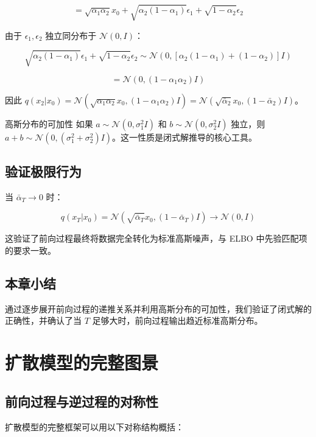 \documentclass[a4paper]{article}
\begin{document}
$$= \sqrt{\alpha_1 \alpha_2} x_0 + \sqrt{\alpha_2(1-\alpha_1)} \epsilon_1 + \sqrt{1-\alpha_2} \epsilon_2$$

由于 $\epsilon_1, \epsilon_2$ 独立同分布于 $\mathcal{N}(0, I)$：

$$\sqrt{\alpha_2(1-\alpha_1)} \epsilon_1 + \sqrt{1-\alpha_2} \epsilon_2 \sim \mathcal{N}(0, [\alpha_2(1-\alpha_1) + (1-\alpha_2)] I)$$

$$= \mathcal{N}(0, (1 - \alpha_1 \alpha_2) I)$$

因此 $q(x_2 | x_0) = \mathcal{N}(\sqrt{\alpha_1 \alpha_2} x_0, (1 - \alpha_1 \alpha_2) I) = \mathcal{N}(\sqrt{\bar{\alpha}_2} x_0, (1-\bar{\alpha}_2) I)$。

\begin{knowledgebox}{高斯分布的可加性}
如果 $a \sim \mathcal{N}(0, \sigma_1^2 I)$ 和 $b \sim \mathcal{N}(0, \sigma_2^2 I)$ 独立，则 $a + b \sim \mathcal{N}(0, (\sigma_1^2 + \sigma_2^2) I)$。这一性质是闭式解推导的核心工具。
\end{knowledgebox}

\subsection{验证极限行为}

当 $\bar{\alpha}_T \to 0$ 时：

$$q(x_T | x_0) = \mathcal{N}(\sqrt{\bar{\alpha}_T} x_0, (1-\bar{\alpha}_T)I) \to \mathcal{N}(0, I)$$

这验证了前向过程最终将数据完全转化为标准高斯噪声，与 ELBO 中先验匹配项的要求一致。

\subsection{本章小结}

通过逐步展开前向过程的递推关系并利用高斯分布的可加性，我们验证了闭式解的正确性，并确认了当 $T$ 足够大时，前向过程输出趋近标准高斯分布。


\section{扩散模型的完整图景}

\subsection{前向过程与逆过程的对称性}

扩散模型的完整框架可以用以下对称结构概括：
\end{document}
